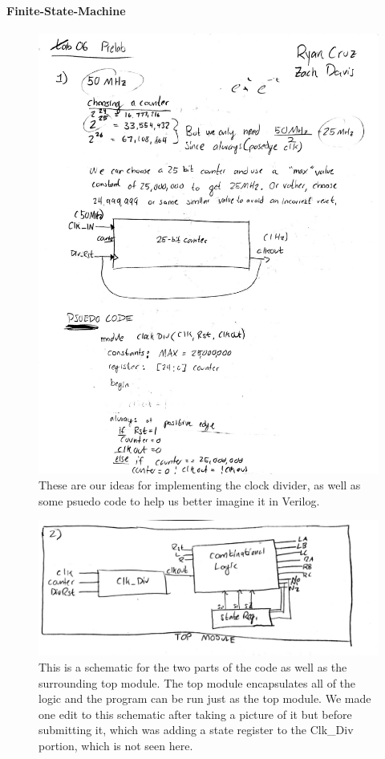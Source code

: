 \documentclass[12pt]{report}
\begin{document}
		\paragraph*{Finite-State-Machine}
			\hfill
			\begin{figure}[h]
				\centering
				\includegraphics[scale=.44]{Prelab_6-page1.pdf}
				\caption{These are our ideas for implementing the clock divider, as well as some psuedo code to help us better imagine it in Verilog.}
			\end{figure}
			\newpage
			\begin{figure}[h]
				\centering
				\includegraphics[scale=.44]{Prelab_6-page2.pdf}
				\caption{This is a schematic for the two parts of the code as well as the surrounding top module. The top module encapsulates all of the logic and the program can be run just as the top module. We made one edit to this schematic after taking a picture of it but before submitting it, which was adding a state register to the Clk\_Div portion, which is not seen here.}
			\end{figure}
\end{document}
